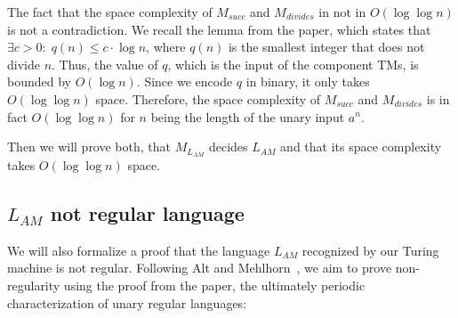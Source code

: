 \documentclass[UTF8]{article}
\begin{document}



The fact that the space complexity of $M_{succ}$ and $M_{divides}$ in not in $O(\log \log n)$ is not a contradiction.
We recall the lemma from the paper, which states that $\exists c>0:\; q(n) \leq c \cdot \log n$, where $q(n)$ is the smallest integer that does not divide $n$.
Thus, the value of $q$, which is the input of the component TMs, is bounded by $O(\log n)$.
Since we encode $q$ in binary, it only takes $O(\log \log n)$ space.
Therefore, the space complexity of $M_{succ}$ and $M_{divides}$ is in fact $O(\log \log n)$ for $n$ being the length of the unary input $a^n$.

Then we will prove both, that $M_{L_{AM}}$ decides $L_{AM}$ and that its space complexity takes $O(\log \log n)$ space.

\subsection{$L_{AM}$ not regular language}

We will also formalize a proof that the language $L_{AM}$ recognized by our Turing machine is not regular.
Following Alt and Mehlhorn~\cite{Lang-OneSymbAlph-LogLogn-HM-1975}, we aim to prove non-regularity using the proof from the paper, the ultimately periodic characterization of unary regular languages:
\end{document}
